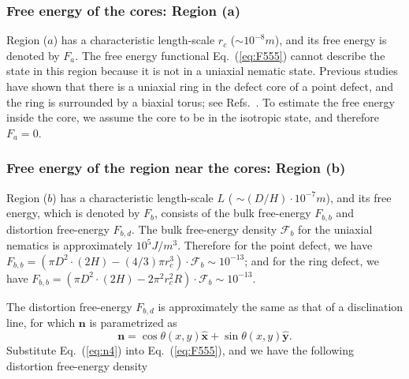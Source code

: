 \documentclass[nottitlepage]{article}
\begin{document}
     \subsubsection {Free energy of the cores: Region (a)}

     Region ($a$) has a characteristic length-scale $r_c$ ($\sim 10^{-8}m$), and its free energy is denoted by $F_a$. The free energy functional Eq.~(\ref{eq:F555}) cannot describe the state in this region because it is not in a uniaxial nematic state. Previous studies have shown that there is a uniaxial ring in the defect core of a point defect, and the ring is surrounded by a biaxial torus; see Refs.~\cite{trebin2, zumer2, luca}. To estimate the free energy inside the core, we assume the core to be in the isotropic state, and therefore $F_a=0$.

     \subsubsection {Free energy of the region near the cores: Region (b)}\label{sssecc:topoo}

  Region ($b$) has a characteristic length-scale $L$ ( $\sim (D/H)\cdot 10^{-7}m$), and its free energy, which is denoted by $F_b$, consists of the bulk free-energy $F_{b,b}$ and distortion free-energy $F_{b,d}$. The bulk free-energy density $\mathcal{F}_{b}$ for the uniaxial nematics is approximately $10^5 J/ m^{3}$. Therefore for the point defect, we have $F_{b,b}=(\pi D^2\cdot(2H)-(4/3)\pi r_c^3)\cdot\mathcal{F}_{b}\sim 10^{-13}$; and for the ring defect, we have $F_{b,b}=(\pi D^2\cdot(2H)-2\pi^{2} r_c^2 R)\cdot\mathcal{F}_{b}\sim 10^{-13}$.

 The distortion free-energy $F_{b,d}$ is approximately the same as that of a disclination line, for which  $\mathbf{n}$ is parametrized as
     \begin{equation}\label{eq:n4}
     \mathbf{n}=\cos\theta (x,y)\hat{\mathbf{x}}+\sin\theta (x,y)\hat{\mathbf{y}}.
      \end{equation}
      Substitute Eq.~(\ref{eq:n4}) into Eq.~(\ref{eq:F555}), and we have the following distortion free-energy density
\end{document}
